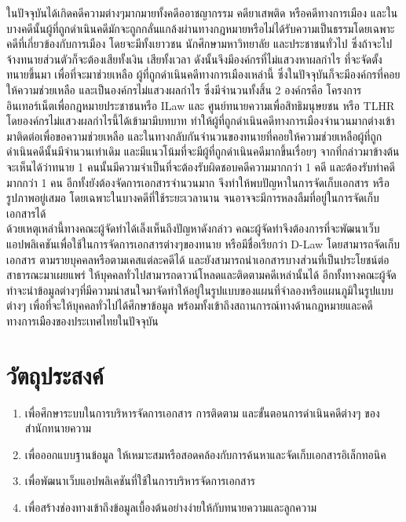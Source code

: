 \documentclass[12pt,oneside,openright,a4paper]{cpe-thai-project}
\begin{document}
\hspace*{1cm} ในปัจจุบันได้เกิดคดีความต่างๆมากมายทั้งคดีออาชญากรรม คดียาเสพติด หรือคดีทางการเมือง และในบางคดีนั้นผู้ที่ถูกดำเนินคดีมักจะถูกกลั่นแกล้งผ่านทางกฎหมายหรือไม่ได้รับความเป็นธรรมโดยเฉพาะคดีที่เกี่ยวข้องกับการเมือง โดยจะมีทั้งเยาวชน นักศึกษามหาวิทยาลัย และประชาชนทั่วไป ซึ่งถ้าจะไปจ้างทนายส่วนตัวก็จะต้องเสียทั้งเงิน เสียทั้งเวลา ดังนั้นจึงมีองค์กรที่ไม่แสวงหาผลกำไร ที่จะจัดตั้งทนายขึ้นมา เพื่อที่จะมาช่วยเหลือ ผู้ที่ถูกดำเนินคดีทางการเมืองเหล่านี้ ซึ่งในปัจจุบันก็จะมีองค์กรที่คอยให้ความช่วยเหลือ และเป็นองค์กรไม่แสวงผลกำไร ซึ่งมีจำนวนทั้งสิ้น 2 องค์กรคือ โครงการอินเทอร์เน็ตเพื่อกฎหมายประชาชนหรือ ILaw และ ศูนย์ทนายความเพื่อสิทธิมนุษยชน หรือ TLHR โดยองค์กรไม่แสวงผลกำไรนี้ได้เข้ามามีบทบาท ทำให้ผู้ที่ถูกดำเนินคดีทางการเมืองจำนวนมากต่างเข้ามาติดต่อเพื่อขอความช่วยเหลือ และในทางกลับกันจำนวนของทนายที่คอยให้ความช่วยเหลือผู้ที่ถูกดำเนินคดีนั้นมีจำนวนเท่าเดิม และมีแนวโน้มที่จะมีผู้ที่ถูกดำเนินคดีมากขึ้นเรื่อยๆ จากที่กล่าวมาข้างต้นจะเห็นได้ว่าทนาย 1 คนนั้นมีความจำเป็นที่จะต้องรับผิดชอบคดีความมากกว่า 1 คดี และต้องรับทำคดีมากกว่า 1 คน อีกทั้งยังต้องจัดการเอกสารจำนวนมาก จึงทำให้พบปัญหาในการจัดเก็บเอกสาร หรือรูปภาพอยู่เสมอ โดยเฉพาะในบางคดีที่ใช้ระยะเวลานาน จนอาจจะมีการหลงลืมที่อยู่ในการจัดเก็บเอกสารได้ \\
\hspace*{1cm} ด้วยเหตุเหล่านี้ทางคณะผู้จัดทำได้เล็งเห็นถึงปัญหาดังกล่าว คณะผู้จัดทำจึงต้องการที่จะพัฒนาเว็บแอปพลิเคชันเพื่อใช้ในการจัดการเอกสารต่างๆของทนาย หรือมีชื่อเรียกว่า D-Law โดยสามารถจัดเก็บเอกสาร ตามรายบุคคลหรือตามเคสแต่ละคดีได้ และยังสามารถนำเอกสารบางส่วนที่เป็นประโยชน์ต่อสาธารณะมาเผยแพร่ ให้บุคคลทั่วไปสามารถดาวน์โหลดและติดตามคดีเหล่านั้นได้ อีกทั้งทางคณะผู้จัดทำจะนำข้อมูลต่างๆที่มีความน่าสนใจมาจัดทำให้อยู่ในรูปแบบของแผนที่จำลองหรือแผนภูมิในรูปแบบต่างๆ เพื่อที่จะให้บุคคลทั่วไปได้ศึกษาข้อมูล พร้อมทั้งเข้าถึงสถานการณ์ทางด้านกฎหมายและคดีทางการเมืองของประเทศไทยในปัจจุบัน

\section{วัตถุประสงค์}
\begin{enumerate}
  \item เพื่อศึกษาระบบในการบริหารจัดการเอกสาร การติดตาม และขั้นตอนการดำเนินคดีต่างๆ ของสำนักทนายความ
  \item เพื่อออกแบบฐานข้อมูล ให้เหมาะสมหรือสอดคล้องกับการค้นหาและจัดเก็บเอกสารอิเล็กทอนิค
  \item เพื่อพัฒนาเว็บแอปพลิเคชันที่ใช้ในการบริหารจัดการเอกสาร
  \item เพื่อสร้างช่องทางเข้าถึงข้อมูลเบื้องต้นอย่างง่ายให้กับทนายความและลูกความ
\end{enumerate}
\end{document}
